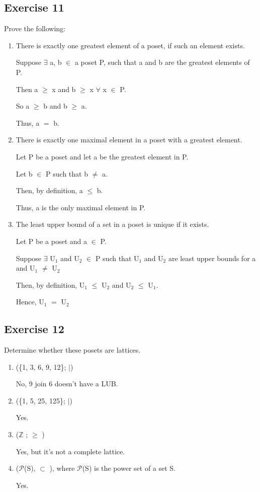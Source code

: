 \documentclass{article}
\newcommand{\mt}[1]{\ensuremath{#1}}
\newcommand\ssc[2][\DefaultOpt]{%
  \def\DefaultOpt{#2}%
  \subsection[#1]{#2}%
}
\newcommand{\balist}{\begin{enumerate}[label=\alph*.]}
\newcommand{\elist}{\end{enumerate}}
\newcommand{\bz}{\mt{\mathbb{Z}} }       %
\newcommand{\fa}{\mt{\forall} }          %
\newcommand{\mem}{\mt{\in} }
\newcommand{\exs}{\mt{\exists} }
\newcommand{\sbs}{\mt{\subset} }         %
\newcommand{\bk}[1]{\{#1\}}
\newcommand{\lse}{\mt{\leq} }
\newcommand{\gre}{\mt{\geq} }
\newcommand{\eql}{\mt{=} }
\newcommand{\uw}[2]{#1\mt{_{#2}}}
\begin{document}
\ssc{Exercise 11}{

Prove the following:

\balist
\item There is exactly one greatest element of a poset, if such an element exists.

Suppose \exs a, b \mem a poset P, such that a and b are the greatest elements of P.

Then a \gre x and b \gre x \fa x \mem P.

So a \gre b and b \gre a.

Thus, a \eql b.

\item There is exactly one maximal element in a poset with a greatest element.

Let P be a poset and let a be the greatest element in P.

Let b \mem P such that b $\neq$ a.

Then, by definition, a \lse b.

Thus, a is the only maximal element in P.

\item The least upper bound of a set in a poset is unique if it exists.

Let P be a poset and a \mem P.

Suppose \exs \uw{U}{1} and \uw{U}{2} \mem P such that \uw{U}{1} and \uw{U}{2} are least upper bounds for a and \uw{U}{1} $\neq$ \uw{U}{2}

Then, by definition, \uw{U}{1} \lse \uw{U}{2} and \uw{U}{2} \lse \uw{U}{1}.

Hence, \uw{U}{1} \eql \uw{U}{2}
\elist

}

\ssc{Exercise 12}{

Determine whether these posets are lattices.

\balist
\item (\bk{1, 3, 6, 9, 12}; $\vert$)

No, 9 join 6 doesn't have a LUB.

\item (\bk{1, 5, 25, 125}; $\vert$)

Yes.

\item (\bz; \gre)

Yes, but it's not a complete lattice.

\item ($\mathcal{P}$(S), \sbs), where $\mathcal{P}$(S) is the power set of a set S.

Yes.

\elist

}
\end{document}
